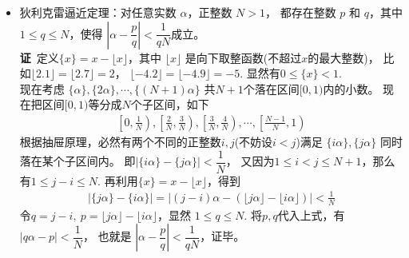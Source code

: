 \begin{itemize}[leftmargin=\inteval{\myitemleftmargin}pt,itemsep=
   \inteval{\myitemitempsep}pt,topsep=\inteval{\myitemtopsep}pt]
\begin{align*}
    \dfrac{(\sqrt{x_2}-\sqrt{x_1})(x_2+\sqrt{x_2x_1}+x_1)}{x_2-x_1}=
    \dfrac{x_2+\sqrt{x_2x_1}+x_1}{\sqrt{x_2}+\sqrt{x_1}} < \dfrac{3}{2}\sqrt{x_2}
\end{align*}
容易验证：$ \dfrac{3}{2}\sqrt{x_1}(\sqrt{x_2}+\sqrt{x_1})<x_2+\sqrt{x_2x_1}+x_1
<\dfrac{3}{2}\sqrt{x_2}(\sqrt{x_2}+\sqrt{x_1}) $.\\
$ \dfrac{n}{m}=-1 $时，
\begin{align*}
    -\dfrac{1}{x_1^2}<\dfrac{\frac{1}{x_2}-\frac{1}{x_1}}{x_2-x_1}=-\dfrac{1}{x_1x_2}<
    -\dfrac{1}{x_2^2}
\end{align*}

\item 狄利克雷逼近定理：对任意实数 $\alpha$，正整数 $N>1$，
都存在整数 $p$ 和 $q$，其中 $1\leq q\leq N$，使得
$\left|\alpha-\dfrac{p}{q}\right|<\dfrac{1}{qN}$成立。  \\
\textbf{证}\ 
定义$\{x\}=x-\lfloor x\rfloor$，其中 $ \lfloor x\rfloor $ 
是向下取整函数(不超过$x$的最大整数)，
比如$ \lfloor 2.1\rfloor=\lfloor 2.7\rfloor=2 $，
$\lfloor -4.2\rfloor=\lfloor -4.9\rfloor=-5 $. 
显然有$ 0\leq \{x\}<1 $.  \\
现在考虑 $\{\alpha\},\{2\alpha\},\cdots,\{(N+1)\alpha\}$
共$N+1$个落在区间$[0,1)$内的小数。
现在把区间$[0,1)$等分成$N$个子区间，如下
\begin{gather*}
    \left[0,\frac{1}{N}\right),
    \left[\frac{2}{N},\frac{3}{N}\right),
    \left[\frac{3}{N},\frac{4}{N}\right),\cdots,
    \left[\frac{N-1}{N},1\right)
\end{gather*}
根据抽屉原理，必然有两个不同的正整数$i,j$(不妨设$i<j$)满足 $\{i\alpha\},\{j\alpha\}$ 同时落在某个子区间内。
即$|\{i\alpha\}-\{j\alpha\}|<\dfrac{1}{N}$，
又因为$1\leq i<j\leq N+1$，那么有$1\leq j-i\leq N$.
再利用$\{x\}=x-\lfloor x\rfloor$，得到
\begin{gather*}
    \left|\{j\alpha\}-\{i\alpha\}\right|=\left|
    (j-i)\alpha-(\lfloor j\alpha\rfloor
    -\lfloor i\alpha\rfloor)\right|<\frac{1}{N}
\end{gather*}
令$q=j-i,\ p=\lfloor j\alpha\rfloor-\lfloor i\alpha\rfloor$，显然 $1\leq q\leq N$. 
将$p,q$代入上式，有 $|q\alpha-p|<\dfrac{1}{N}$，
也就是 $\left|\alpha-\dfrac{p}{q}\right|<\dfrac{1}{qN}$，证毕。


\end{itemize}
